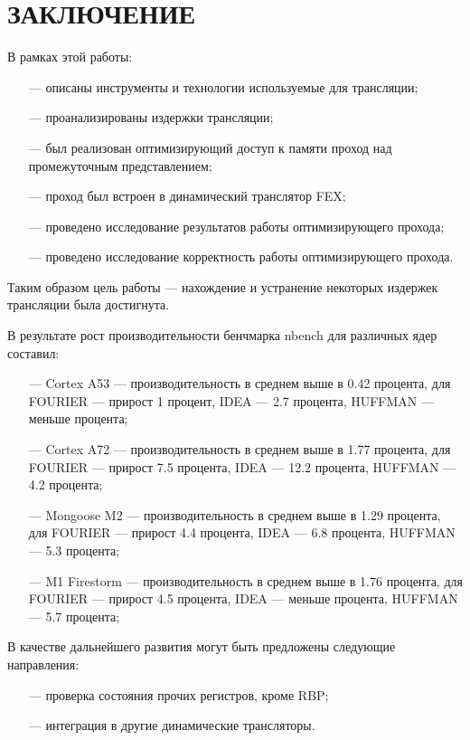 \section*{ЗАКЛЮЧЕНИЕ}

В рамках этой работы:
\begin{itemize}[leftmargin=1.6\parindent]
	\item [---] описаны инструменты и технологии используемые для трансляции;
	\item [---] проанализированы издержки трансляции;
	\item [---] был реализован оптимизирующий доступ к памяти проход над промежуточным представлением;
	\item [---] проход был встроен в динамический транслятор FEX;
	\item [---] проведено исследование результатов работы оптимизирующего прохода;
	\item [---] проведено исследование корректность работы оптимизирующего прохода.
\end{itemize}

Таким образом цель работы --- нахождение и устранение некоторых издержек трансляции была достигнута.

В результате рост производительности бенчмарка nbench для различных ядер составил:
\begin{itemize}[leftmargin=1.6\parindent]
	\item[---] Cortex A53 --- производительность в среднем выше в 0.42 процента, для FOURIER --- прирост 1 процент, IDEA --- 2.7 процента, HUFFMAN --- меньше процента;
	\item[---] Cortex A72 --- производительность в среднем выше в 1.77 процента, для FOURIER --- прирост 7.5 процента, IDEA --- 12.2 процента, HUFFMAN --- 4.2 процента;
	\item[---] Mongoose M2 --- производительность в среднем выше в 1.29 процента, для FOURIER --- прирост 4.4 процента, IDEA --- 6.8 процента, HUFFMAN --- 5.3 процента;
	\item[---] M1 Firestorm --- производительность в среднем выше в 1.76 процента, для FOURIER --- прирост 4.5 процента, IDEA --- меньше процента, HUFFMAN --- 5.7 процента;
\end{itemize}

В качестве дальнейшего развития могут быть предложены следующие
направления:

\begin{itemize}[leftmargin=1.6\parindent]
	\item [---] проверка состояния прочих регистров, кроме RBP;
	\item [---] интеграция в другие динамические трансляторы.
\end{itemize}

\pagebreak